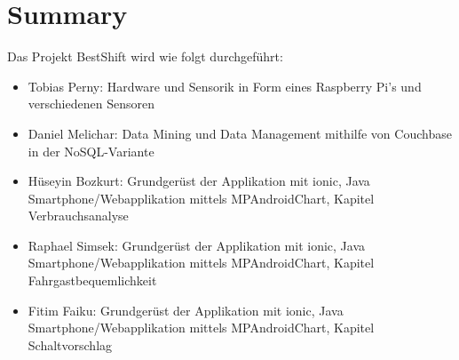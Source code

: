 \chapter{Summary}
Das Projekt BestShift wird wie folgt durchgeführt:
	\begin{itemize}
		\item Tobias Perny: Hardware und Sensorik in Form eines Raspberry Pi's und verschiedenen Sensoren 
		\item Daniel Melichar: Data Mining und Data Management mithilfe von Couchbase in der NoSQL-Variante
		\item Hüseyin Bozkurt: Grundgerüst der Applikation mit ionic, Java Smartphone/Webapplikation mittels MPAndroidChart, Kapitel Verbrauchsanalyse 
		\item Raphael Simsek:  Grundgerüst der Applikation mit ionic, Java Smartphone/Webapplikation mittels MPAndroidChart, Kapitel Fahrgastbequemlichkeit
		\item Fitim Faiku:     Grundgerüst der Applikation mit ionic, Java Smartphone/Webapplikation mittels MPAndroidChart, Kapitel Schaltvorschlag
	\end{itemize}

